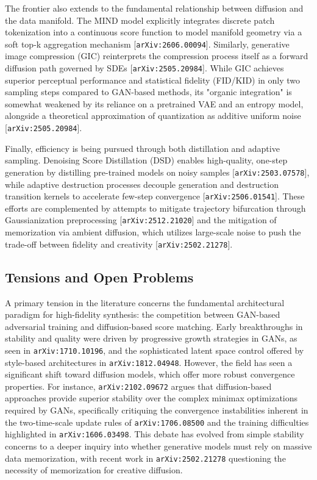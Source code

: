 \documentclass[11pt]{article}
\begin{document}
The frontier also extends to the fundamental relationship between diffusion and the data manifold. The MIND model explicitly integrates discrete patch tokenization into a continuous score function to model manifold geometry via a soft top-k aggregation mechanism [\texttt{arXiv:2606.00094}]. Similarly, generative image compression (GIC) reinterprets the compression process itself as a forward diffusion path governed by SDEs [\texttt{arXiv:2505.20984}]. While GIC achieves superior perceptual performance and statistical fidelity (FID/KID) in only two sampling steps compared to GAN-based methods, its "organic integration" is somewhat weakened by its reliance on a pretrained VAE and an entropy model, alongside a theoretical approximation of quantization as additive uniform noise [\texttt{arXiv:2505.20984}].

Finally, efficiency is being pursued through both distillation and adaptive sampling. Denoising Score Distillation (DSD) enables high-quality, one-step generation by distilling pre-trained models on noisy samples [\texttt{arXiv:2503.07578}], while adaptive destruction processes decouple generation and destruction transition kernels to accelerate few-step convergence [\texttt{arXiv:2506.01541}]. These efforts are complemented by attempts to mitigate trajectory bifurcation through Gaussianization preprocessing [\texttt{arXiv:2512.21020}] and the mitigation of memorization via ambient diffusion, which utilizes large-scale noise to push the trade-off between fidelity and creativity [\texttt{arXiv:2502.21278}].

\subsection{Tensions and Open Problems}

A primary tension in the literature concerns the fundamental architectural paradigm for high-fidelity synthesis: the competition between GAN-based adversarial training and diffusion-based score matching. Early breakthroughs in stability and quality were driven by progressive growth strategies in GANs, as seen in \texttt{arXiv:1710.10196}, and the sophisticated latent space control offered by style-based architectures in \texttt{arXiv:1812.04948}. However, the field has seen a significant shift toward diffusion models, which offer more robust convergence properties. For instance, \texttt{arXiv:2102.09672} argues that diffusion-based approaches provide superior stability over the complex minimax optimizations required by GANs, specifically critiquing the convergence instabilities inherent in the two-time-scale update rules of \texttt{arXiv:1706.08500} and the training difficulties highlighted in \texttt{arXiv:1606.03498}. This debate has evolved from simple stability concerns to a deeper inquiry into whether generative models must rely on massive data memorization, with recent work in \texttt{arXiv:2502.21278} questioning the necessity of memorization for creative diffusion.
\end{document}
